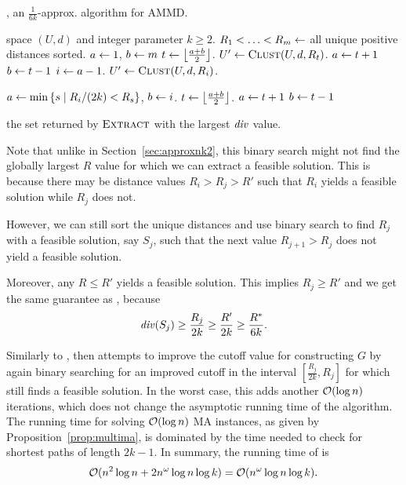 \begin{algorithm}[t]
\caption{, an $\frac{1}{6k}$-approx. algorithm for AMMD.}\label{algo:bacf} 
\begin{algorithmic}[1]
\Require space $(U, d)$ and integer parameter $k\geq 2$.
\State $R_1 < \ldots < R_{m} \leftarrow $ all unique positive distances sorted.
\State $a \leftarrow 1$, $b \leftarrow m$
    \State $t \leftarrow {\left\lfloor\frac{a+b}{2}\right\rfloor}$.
	\State ${U}' \define \algclust{U, d, R_t}$. 
		$a \leftarrow t + 1$
	\Else{}
		$b \leftarrow t - 1$
	\EndIf
\EndWhile
\State $i \leftarrow a-1$.
\State ${U}' \define \algclust{U, d, R_i}$. 

\State $a \leftarrow \min\left\{s \mid R_i / (2k) < R_s\right\}$, $b \leftarrow i$.
    \State $t \leftarrow {\left\lfloor\frac{a+b}{2}\right\rfloor}$.
		$a \leftarrow t + 1$
	\Else{}
		$b \leftarrow t - 1$
	\EndIf
\EndWhile

\Ensure the set returned by $\algextract{}$ with the largest $\diver{}$ value.
\end{algorithmic}
\end{algorithm}


Note that unlike in Section~\ref{sec:approxnk2}, this binary search might not find the globally largest $R$ value for which we can extract a feasible solution.
This is because there may be distance values $R_i > R_j > R'$ such that $R_i$ yields a feasible solution while $R_j$ does not.

However, we can still sort the
unique distances and use binary search to find
$R_{j}$ with a feasible solution, say $S_j$, such that the next value
$R_{j+1} > R_{j}$ does not yield a feasible solution.

Moreover, any $R \leq R'$ yields a feasible solution. This implies $R_{j} \geq R'$ and we get the same guarantee as \algbac{}, because
\[
	\diver{S_{j}} \geq \frac{R_j}{2k} \geq \frac{R'}{2k} \geq \frac{R^*}{6k}.
\]

Similarly to \algbacb{}, \algbacf{} then attempts to improve the cutoff
value for constructing $G$ by again binary searching for an improved cutoff
in the interval $[\frac{R_j}{2k},R_j]$ for which \algextract{} still finds a feasible
solution.
In the worst case, this adds
another $\mathcal{O}(\log n)$ iterations, which does not change the asymptotic
running time of the algorithm.
The running time for solving $\mathcal{O}(\log n)$ MA instances, as given by Proposition~\ref{prop:multima},
is dominated by the time needed to check for shortest paths of length $2k-1$.
In summary, the running time of \algbacf{} is
\[
	\mathcal{O}(n^2 \log n + 2 n^{\omega} \log n \log k) = \mathcal{O}(n^{\omega} \log n \log k).
\]

